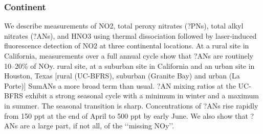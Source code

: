 \documentclass[11pt,a4paper]{article}
\begin{document}
\subsubsection*{Continent}
\citep{Day2003}
We describe measurements of NO2, total peroxy nitrates (?PNs), total alkyl nitrates (?ANs), and HNO3 using thermal dissociation followed by laser-induced fluorescence detection of NO2 at three continental locations. At a rural site in California, measurements over a full annual cycle show that ?ANs are routinely 10–20\% of NOy. rural site, at a suburban site in California and an urban site in Houston, Texas [rural (UC-BFRS), suburban (Granite Bay) and urban (La Porte)]
SumANs a more broad term than usual.
?AN mixing ratios at the UC-BFRS exhibit a strong seasonal cycle with a minimum in winter and a maximum in summer. The seasonal transition is sharp. Concentrations of ?ANs rise rapidly from 150 ppt at the end of April to 500 ppt by early June.
We also show that ?ANs are a large part, if not all, of the ‘‘missing NOy’’.
\end{document}
